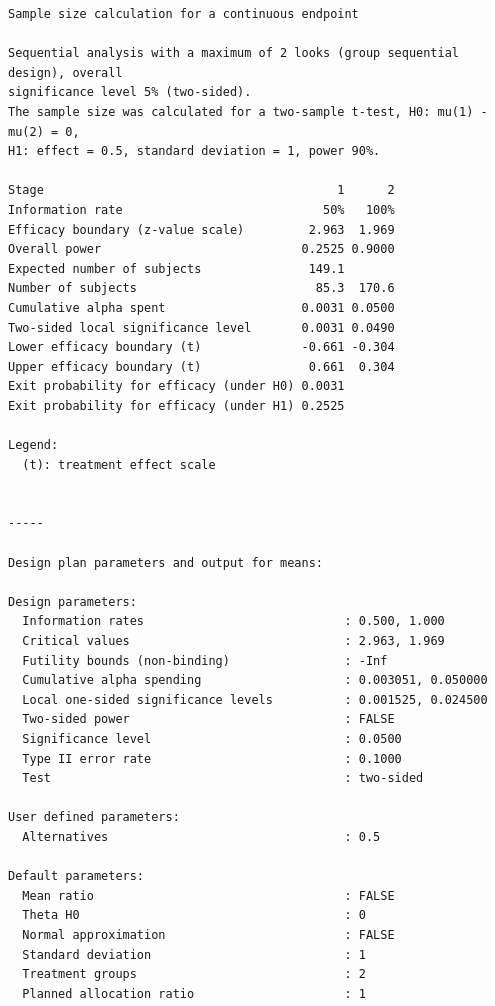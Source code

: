 \documentclass[
  letterpaper,
  DIV=11,
  numbers=noendperiod]{scrreprt}
\begin{document}
\begin{verbatim}
Sample size calculation for a continuous endpoint

Sequential analysis with a maximum of 2 looks (group sequential design), overall 
significance level 5% (two-sided).
The sample size was calculated for a two-sample t-test, H0: mu(1) - mu(2) = 0, 
H1: effect = 0.5, standard deviation = 1, power 90%.

Stage                                         1      2 
Information rate                            50%   100% 
Efficacy boundary (z-value scale)         2.963  1.969 
Overall power                            0.2525 0.9000 
Expected number of subjects               149.1 
Number of subjects                         85.3  170.6 
Cumulative alpha spent                   0.0031 0.0500 
Two-sided local significance level       0.0031 0.0490 
Lower efficacy boundary (t)              -0.661 -0.304 
Upper efficacy boundary (t)               0.661  0.304 
Exit probability for efficacy (under H0) 0.0031 
Exit probability for efficacy (under H1) 0.2525 

Legend:
  (t): treatment effect scale


-----

Design plan parameters and output for means:

Design parameters:
  Information rates                            : 0.500, 1.000 
  Critical values                              : 2.963, 1.969 
  Futility bounds (non-binding)                : -Inf 
  Cumulative alpha spending                    : 0.003051, 0.050000 
  Local one-sided significance levels          : 0.001525, 0.024500 
  Two-sided power                              : FALSE 
  Significance level                           : 0.0500 
  Type II error rate                           : 0.1000 
  Test                                         : two-sided 

User defined parameters:
  Alternatives                                 : 0.5 

Default parameters:
  Mean ratio                                   : FALSE 
  Theta H0                                     : 0 
  Normal approximation                         : FALSE 
  Standard deviation                           : 1 
  Treatment groups                             : 2 
  Planned allocation ratio                     : 1 


\end{verbatim}
\end{document}
